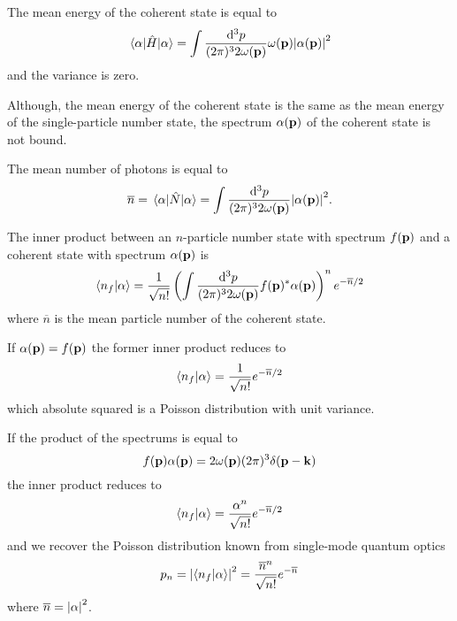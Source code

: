 \begin{lemma}\label{thm:coherent_state_energy_observable}
	The mean energy of the coherent state is equal to
	\begin{equation}
		\expval{\hat{H}}{\alpha}
		=
		\int\frac{\dd[3]{p}}{(2\pi)^32\omega(\vb{p})}
		\omega(\vb{p})
		\abs{\alpha(\vb{p})}^2		
	\end{equation}
	and the variance is zero.
\end{lemma}
Although, the mean energy of the coherent state is the same as the mean energy of the single-particle number state, the spectrum $\alpha(\vb{p})$ of the coherent state is not bound.
\begin{corollary}
	The mean number of photons is equal to
	\begin{equation}
		\overline{n}
		=
		\expval{\hat{N}}{\alpha}
		=
		\int\frac{\dd[3]{p}}{(2\pi)^32\omega(\vb{p})}
		\abs{\alpha(\vb{p})}^2
		.
	\end{equation}
\end{corollary}
\begin{lemma}\label{thm:coherent_state_number_state_inner_product}
	The inner product between an $n$-particle number state with spectrum $f(\vb{p})$ and a coherent state with spectrum $\alpha(\vb{p})$ is
	\begin{equation}
		\braket{n_f}{\alpha}
		=
		\frac{1}{\sqrt{n!}}
		\left(
			\int\frac{\dd[3]{p}}{(2\pi)^32\omega(\vb{p})}
			f(\vb{p})^*
			\alpha(\vb{p})
		\right)^n
		e^{-\overline{n}/2}
	\end{equation}
	where $\overline{n}$ is the mean particle number of the coherent state.
\end{lemma}
\begin{corollary}
	If $\alpha(\vb{p})=f(\vb{p})$ the former inner product reduces to
	\begin{equation}
		\braket{n_f}{\alpha}
		=
		\frac{1}{\sqrt{n!}}
		e^{-\overline{n}/2}
	\end{equation}
	which absolute squared is a Poisson distribution with unit variance.
\end{corollary}
\begin{corollary}
	If the product of the spectrums is equal to
	\begin{equation}
		f(\vb{p})
		\alpha(\vb{p})
		=
		2\omega(\vb{p})
		(2\pi)^3
		\delta(\vb{p}-\vb{k})
	\end{equation}
	the inner product reduces to
	\begin{equation}
		\braket{n_f}{\alpha}
		=
		\frac{\alpha^n}{\sqrt{n!}}
		e^{-\overline{n}/2}
	\end{equation}
	and we recover the Poisson distribution known from single-mode quantum optics
	\begin{equation}
		p_n
		=
		\abs{\braket{n_f}{\alpha}}^2
		=
		\frac{\overline{n}^n}{\sqrt{n!}}
		e^{-\overline{n}}
	\end{equation}
	where $\overline{n}=\abs{\alpha}^2$.
\end{corollary}